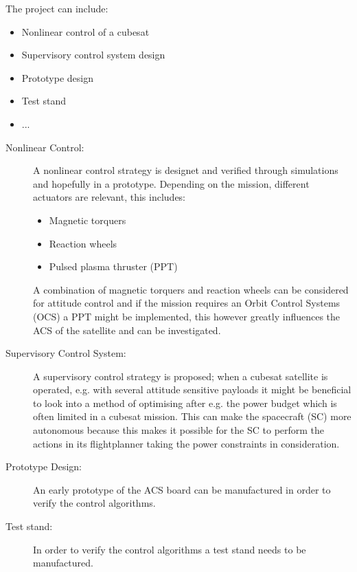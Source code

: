 The project can include:
\begin{itemize}\tightlist
  \item Nonlinear control of a cubesat
  \item Supervisory control system design
  \item Prototype design
  \item Test stand
  \item ...
\end{itemize}

\begin{description}
  \item[Nonlinear Control:] A nonlinear control strategy is designet and verified through simulations and hopefully in a prototype. Depending on the mission, different actuators are relevant, this includes:
    \begin{itemize}\tightlist
      \item Magnetic torquers
      \item Reaction wheels
      \item Pulsed plasma thruster (PPT)
    \end{itemize}
    A combination of magnetic torquers and reaction wheels can be considered for attitude control and if the mission requires an Orbit Control Systems (OCS) a PPT might be implemented, this however greatly influences the ACS of the satellite and can be investigated.
  \item[Supervisory Control System:] A supervisory control strategy is proposed; when a cubesat satellite is operated, e.g. with several attitude sensitive payloads it might be beneficial to look into a method of optimising after e.g. the power budget which is often limited in a cubesat mission. This can make the spacecraft (SC) more autonomous because this makes it possible for the SC to perform the actions in its flightplanner taking the power constraints in consideration.
  \item[Prototype Design:] An early prototype of the ACS board can be manufactured in order to verify the control algorithms.
  \item[Test stand:] In order to verify the control algorithms a test stand needs to be manufactured.
\end{description}
